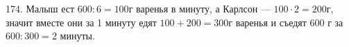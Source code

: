 174. Малыш ест $600:6=100$г варенья в минуту, а Карлсон --- $100\cdot2=200$г, значит вместе они за 1 минуту едят $100+200=300$г варенья и съедят 600 г за $600:300=2$ минуты.\\
